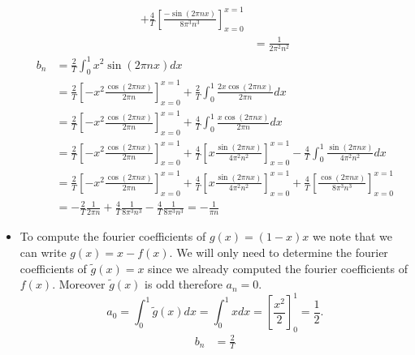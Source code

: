 \documentclass[11pt]{article}
\begin{document}
\begin{solution}
\begin{itemize}
\begin{align*}
            +
            \frac{4}{T}
            \left[ \frac{ -\sin(2\pi n x) }{ 8\pi^3 n^3 } \right]_{x=0}^{x=1}
	\\&
	= 
	\frac{1}{2\pi^2 n^2}
        \end{align*}
        \begin{align*}
            b_n 
            &
            = 
            \frac{2}{T}
            \int_{0}^{1} x^2 \sin(2\pi n x) dx
            \\&
            =
            \frac{2}{T}
            \left[- x^2 \frac{ \cos(2\pi n x) }{ 2\pi n } \right]_{x=0}^{x=1}
            +
            \frac{2}{T}
            \int_{0}^{1} \frac{ 2x \cos(2\pi n x) }{ 2\pi n } dx
            \\&
            =
            \frac{2}{T}
            \left[- x^2 \frac{ \cos(2\pi n x) }{ 2\pi n } \right]_{x=0}^{x=1}
            +
            \frac{4}{T}
            \int_{0}^{1} \frac{ x \cos(2\pi n x) }{ 2\pi n } dx
            \\&
            =
            \frac{2}{T}
            \left[ -x^2 \frac{ \cos(2\pi n x) }{ 2\pi n } \right]_{x=0}^{x=1}
            +
            \frac{4}{T}
            \left[ x \frac{ \sin(2\pi n x) }{ 4\pi^2 n^2 } \right]_{x=0}^{x=1}
            -
            \frac{4}{T}
            \int_{0}^{1} \frac{ \sin(2\pi n x) }{ 4\pi^2 n^2 } dx
            \\&
            =
            \frac{2}{T}
            \left[ -x^2 \frac{ \cos(2\pi n x) }{ 2\pi n } \right]_{x=0}^{x=1}
            +
            \frac{4}{T}
            \left[ x \frac{ \sin(2\pi n x) }{ 4\pi^2 n^2 } \right]_{x=0}^{x=1}
            +
            \frac{4}{T}
            \left[ \frac{ \cos(2\pi n x) }{ 8\pi^3 n^3 } \right]_{x=0}^{x=1}
	\\&
	= 
	-\frac{2}{T}\frac{1}{2\pi n} + \frac{4}{T}\frac{1}{8\pi^3n^3} -  \frac{4}{T}\frac{1}{8\pi^3n^3} = -\frac{1}{\pi n}
        \end{align*}
        \item To compute the fourier coefficients of $g(x) = (1-x)x$ we note that we can write $g(x) = x - f(x)$. We will only need to determine the 		fourier coefficients of $\tilde{g}(x) = x$ since we already computed the fourier coefficients of $f(x)$. Moreover $\tilde{g}(x)$ is odd therefore $a_n = 0$. 
	\[
            a_0 = \int_{0}^{1} \tilde{g}(x) dx  = \int_{0}^{1} x dx  = \left[ \frac{x^2}{2} \right]_{0}^{1} = \frac 1 2.
        \]
        \begin{align*}
            b_n 
            &
            = 
            \frac{2}{T}

\end{align*}
\end{itemize}
\end{solution}
\end{document}
